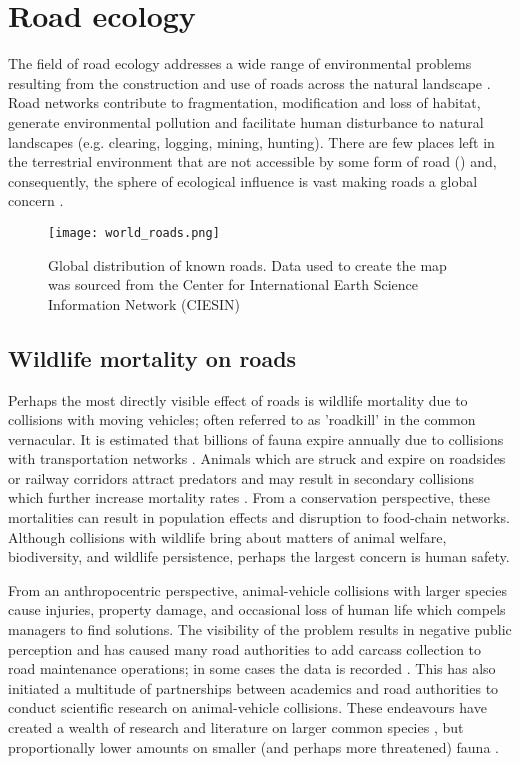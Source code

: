 \section{Road ecology}

The field of road ecology addresses a wide range of environmental problems resulting from the construction and use of roads across the natural landscape \citep{form03,rvdr15}. Road networks contribute to fragmentation, modification and loss of habitat, generate environmental pollution and facilitate human disturbance to natural landscapes (e.g. clearing, logging, mining, hunting). There are few places left in the terrestrial environment that are not accessible by some form of road () and, consequently, the sphere of ecological influence is vast making roads a global concern \citep{laur14}.

\begin{figure*}[htp]
  \centering
  \texttt{[image: world\_roads.png]}
  \caption[Global distribution of known roads]{Global distribution of known roads. Data used to create the map was sourced from the Center for International Earth Science Information Network (CIESIN)}
  \label{roads}
\end{figure*}

\subsection{Wildlife mortality on roads}

Perhaps the most directly visible effect of roads is wildlife mortality due to collisions with moving vehicles; often referred to as 'roadkill' in the common vernacular.  It is estimated that billions of fauna expire annually due to collisions with transportation networks \citep{seil06}.  Animals which are struck and expire on roadsides or railway corridors attract predators and may result in secondary collisions which further increase mortality rates \citep{spel98}.  From a conservation perspective, these mortalities can result in population effects and disruption to food-chain networks.  Although collisions with wildlife bring about matters of animal welfare, biodiversity, and wildlife persistence, perhaps the largest concern is human safety. 

From an anthropocentric perspective, animal-vehicle collisions with larger species cause injuries, property damage, and occasional loss of human life which compels managers to find solutions. The visibility of the problem results in negative public perception and has caused many road authorities to add carcass collection to road maintenance operations; in some cases the data is recorded \citep{huij07a}. This has also initiated a multitude of partnerships between academics and road authorities to conduct scientific research on animal-vehicle collisions.  These endeavours have created a wealth of research and literature on larger common species \citep{biss08b,clev01,romi96,sudh09}, but proportionally lower amounts on smaller (and perhaps more threatened) fauna \citep{clev03}.

